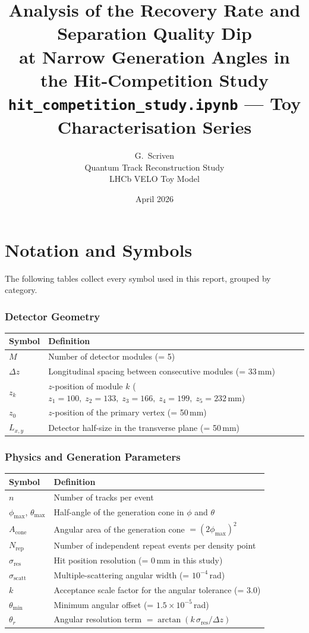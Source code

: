 \documentclass[12pt,a4paper]{article}
\title{\textbf{Analysis of the Recovery Rate and Separation Quality Dip\\
at Narrow Generation Angles in the Hit-Competition Study}\\[0.5em]
{\large \texttt{hit\_competition\_study.ipynb} — Toy Characterisation Series}}
\author{G.\ Scriven\\[0.3em]
Quantum Track Reconstruction Study\\
LHCb VELO Toy Model}
\date{April 2026}
\begin{document}
\maketitle
\tableofcontents

\newpage

\section*{Notation and Symbols}
\label{sec:notation}

The following tables collect every symbol used in this report, grouped by
category.

\subsubsection*{Detector Geometry}
\begin{tabular}{@{}lp{10.5cm}@{}}
  \toprule
  Symbol & Definition \\
  \midrule
  $M$ & Number of detector modules (= 5) \\
  $\Delta z$ & Longitudinal spacing between consecutive modules (= 33\,mm) \\
  $z_k$ & $z$-position of module $k$ ($z_1{=}100,\;z_2{=}133,\;z_3{=}166,\;z_4{=}199,\;z_5{=}232$\,mm) \\
  $z_0$ & $z$-position of the primary vertex (= 50\,mm) \\
  $L_{x,y}$ & Detector half-size in the transverse plane (= 50\,mm) \\
  \bottomrule
\end{tabular}

\bigskip
\subsubsection*{Physics and Generation Parameters}
\begin{tabular}{@{}lp{10.5cm}@{}}
  \toprule
  Symbol & Definition \\
  \midrule
  $n$ & Number of tracks per event \\
  $\phi_\text{max}$, $\theta_\text{max}$ & Half-angle of the generation cone in $\phi$ and $\theta$ \\
  $A_\text{cone}$ & Angular area of the generation cone $= (2\phi_\text{max})^2$ \\
  $N_\text{rep}$ & Number of independent repeat events per density point \\
  $\sigma_\text{res}$ & Hit position resolution (= 0\,mm in this study) \\
  $\sigma_\text{scatt}$ & Multiple-scattering angular width (= $10^{-4}$\,rad) \\
  $k$ & Acceptance scale factor for the angular tolerance (= 3.0) \\
  $\theta_\text{min}$ & Minimum angular offset (= $1.5\times10^{-5}$\,rad) \\
  $\theta_r$ & Angular resolution term $= \arctan(k\,\sigma_\text{res}/\Delta z)$ \\
  \bottomrule
\end{tabular}
\end{document}
